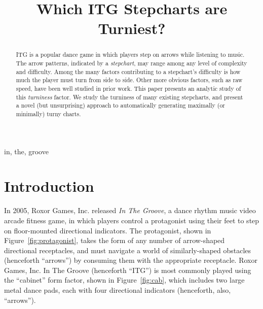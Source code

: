 \documentclass[10pt]{sigplanconf}
\begin{document}
\copyrightdata{}


\title{
Which ITG Stepcharts are Turniest?
}


\maketitle

\begin{abstract}
	ITG is a popular dance game in which players step on arrows while listening to music. The arrow patterns, indicated by a {\em stepchart}, may range among any level of complexity and difficulty. Among the many factors contributing to a stepchart's difficulty is how much the player must turn from side to side.
	Other more obvious factors, such as raw speed, have been well studied in prior work. %
	This paper presents an analytic study of this {\em turniness} factor.
	We study the turniness of many existing stepcharts, and present a novel (but unsurprising) approach to automatically generating maximally (or minimally) turny charts.


\end{abstract}


\keywords
in, the, groove


\section{Introduction}

In 2005, Roxor Games, Inc. released {\em In The Groove}, a dance rhythm music video arcade fitness game, in which players control a protagonist using their feet to step on floor-mounted directional indicators. The protagonist, shown in Figure~\ref{fig:protagonist}, takes the form of any number of arrow-shaped directional receptacles, and must navigate a world of similarly-shaped obstacles (henceforth ``arrows'') by consuming them with the appropriate receptacle.
Roxor Games, Inc. In The Groove (henceforth ``ITG'') is most commonly played using the ``cabinet'' form factor, shown in Figure~\ref{fig:cab}, which includes two large metal dance pads, each with four directional indicators (henceforth, also, ``arrows'').
\end{document}
